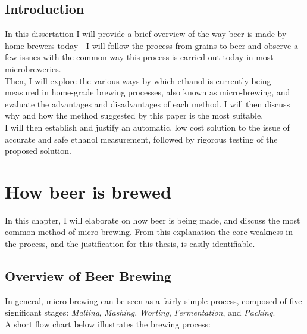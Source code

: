 \documentclass[twoside]{ctuthesis}
\theoremstyle{plain}
\theoremstyle{definition}
\theoremstyle{note}
\begin{document}
\maketitle

\section{Introduction}

In this dissertation I will provide a brief overview of the way beer is made by home brewers today - I will follow the process from grains to beer and observe a few issues with the common way this process is carried out today in most microbreweries.\\
Then, I will explore the various ways by which ethanol is currently being measured in home-grade brewing processes, also known as micro-brewing, and evaluate the advantages and disadvantages of each method. I will then discuss why and how the method suggested by this paper is the most suitable.\\
I will then establish and justify an automatic, low cost solution to the issue of accurate and safe ethanol measurement, followed by rigorous testing of the proposed solution.

\pagebreak 

\begingroup
\renewcommand{\cleardoublepage}{}
\renewcommand{\clearpage}{}
\chapter{How beer is brewed}
\endgroup

In this chapter, I will elaborate on how beer is being made, and discuss the most common method of micro-brewing. From this explanation the core weakness in the process, and the justification for this thesis, is easily identifiable.

\section{Overview of Beer Brewing}
In general, micro-brewing can be seen as a fairly simple process, composed of five significant stages: \textit{Malting}, \textit{Mashing}, \textit{Worting}, \textit{Fermentation}, and \textit{Packing}.\\
A short flow chart below illustrates the brewing process:
\end{document}
